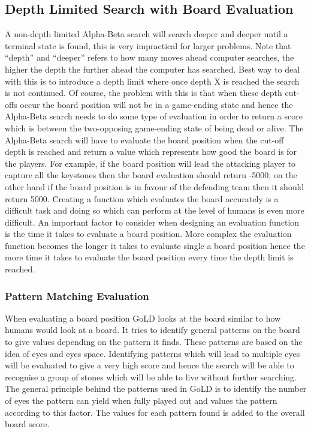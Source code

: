 \documentclass{l4proj}
\begin{document}
\subsection{Depth Limited Search with Board Evaluation}
A non-depth limited Alpha-Beta search will search deeper and deeper until a terminal state is found, this is very impractical for larger problems. Note that “depth” and “deeper” refers to how many moves ahead computer searches, the higher the depth the further ahead the computer has searched. Best way to deal with this is to introduce a depth limit where once depth X is reached the search is not continued. Of course, the problem with this is that when these depth cut-offs occur the board position will not be in a game-ending state and hence the Alpha-Beta search needs to do some type of evaluation in order to return a score which is between the two-opposing game-ending state of being dead or alive. The Alpha-Beta search will have to evaluate the board position when the cut-off depth is reached and return a value which represents how good the board is for the players. For example, if the board position will lead the attacking player to capture all the keystones then the board evaluation should return -5000,   on the other hand if the board position is in favour of the defending team then it should return 5000. Creating a function which evaluates the board accurately is a difficult task and doing so which can perform at the level of humans is even more difficult. An important factor to consider when designing an evaluation function is the time it takes to evaluate a board position. More complex the evaluation function becomes the longer it takes to evaluate single a board position hence the more time it takes to evaluate the board position every time the depth limit is reached.

\subsubsection{Pattern Matching Evaluation}

When evaluating a board position GoLD looks at the board similar to how humans would look at a board. It tries to identify general patterns on the board to give values depending on the pattern it finds. These patterns are based on the idea of eyes and eyes space. Identifying patterns which will lead to multiple eyes will be evaluated to give a very high score and hence the search will be able to recognise a group of stones which will be able to live without further searching. The general principle behind the patterns used in GoLD is to identify the number of eyes the pattern can yield when fully played out and values the pattern according to this factor. The values for each pattern found is added to the overall board score.
\end{document}
